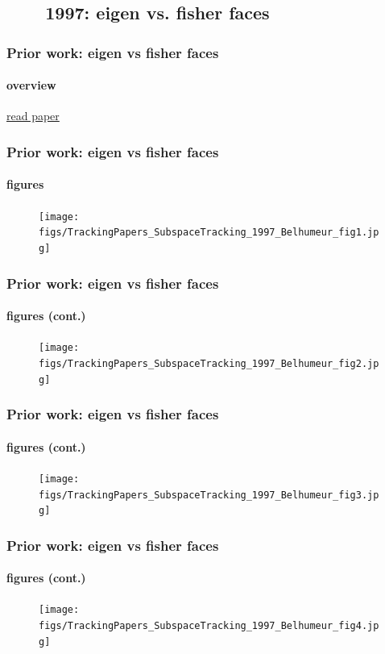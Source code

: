 \subsection{\ \ \ \ 1997: eigen vs. fisher faces}
\begin{frame}
\frametitle{Prior work: eigen vs fisher faces}
\framesubtitle{overview}
\mypagenum
	{\color{blue}  \href{http://users.ece.gatech.edu/~msalman/papers/1997 JNL, Eigenfaces vs. Fisherfaces_ recognition using class specific linear projection (Belhumeur).pdf}{read paper}}
\end{frame}






\begin{frame}
\frametitle{Prior work: eigen vs fisher faces}
\framesubtitle{figures}
\mypagenum
	\begin{figure}
		\texttt{[image: figs/TrackingPapers\_SubspaceTracking\_1997\_Belhumeur\_fig1.jpg]}
	\end{figure}
\end{frame}



\begin{frame}
\frametitle{Prior work: eigen vs fisher faces}
\framesubtitle{figures (cont.)}
\mypagenum
	\begin{figure}
		\texttt{[image: figs/TrackingPapers\_SubspaceTracking\_1997\_Belhumeur\_fig2.jpg]}
	\end{figure}
\end{frame}


\begin{frame}
\frametitle{Prior work: eigen vs fisher faces}
\framesubtitle{figures (cont.)}
\mypagenum
	\begin{figure}
		\texttt{[image: figs/TrackingPapers\_SubspaceTracking\_1997\_Belhumeur\_fig3.jpg]}
	\end{figure}
\end{frame}



\begin{frame}
\frametitle{Prior work: eigen vs fisher faces}
\framesubtitle{figures (cont.)}
\mypagenum
	\begin{figure}
		\texttt{[image: figs/TrackingPapers\_SubspaceTracking\_1997\_Belhumeur\_fig4.jpg]}
	\end{figure}
\end{frame}



